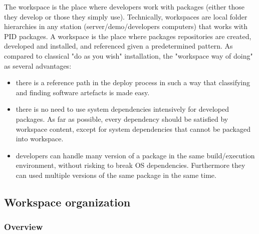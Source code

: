 \documentclass[12pt,a4paper]{article}
\begin{document}
The workspace is the place where developers work with packages (either those they develop or those they simply use). Technically, workspaces are local folder hierarchies in any station (server/demo/developers computers) that works with PID packages. A workspace is the place where packages repositories are created, developed and installed, and referenced given a predetermined pattern. As compared to classical "do as you wish" installation, the "workspace way of doing" as several advantages:
\begin{itemize}
\item there is a reference path in the deploy process in such a way that classifying and finding software artefacts is made easy.
\item there is no need to use system dependencies intensively for developed packages. As far as possible, every dependency should be satisfied by workspace content, except for system dependencies that cannot be packaged into workspace.
\item developers can handle many version of a package in the same build/execution environment, without risking to break OS dependencies. Furthermore they can used multiple versions of the same package in the same time.
\end{itemize}

\subsection{Workspace organization}

\subsubsection{Overview}
\label{sec:workspace}
\end{document}
